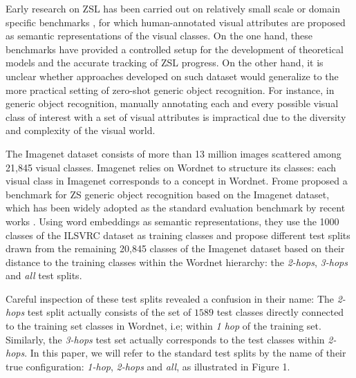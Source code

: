 Early research on ZSL has been carried out on relatively small scale or domain specific benchmarks \cite{lampert2009learning,patterson2012sun,welinder2010caltech}, 
for which human-annotated visual attributes are proposed as semantic representations of the visual classes. 
On the one hand, these benchmarks have provided a controlled setup for the development of theoretical models and the accurate tracking of ZSL progress. 
On the other hand, it is unclear whether approaches developed on such dataset would generalize to the more practical setting of zero-shot generic object recognition.
For instance, in generic object recognition, manually annotating each and every possible visual class of interest with a set of visual attributes is impractical due to the diversity and complexity of the visual world. 

The Imagenet dataset \cite{deng2009imagenet} consists of more than 13 million images scattered among 21,845 visual classes.
Imagenet relies on Wordnet \cite{miller1995wordnet} to structure its classes: each visual class in Imagenet corresponds to a concept in Wordnet.
Frome \etal \cite{frome2013devise} proposed a benchmark for ZS generic object recognition based on the Imagenet dataset,
which has been widely adopted as the standard evaluation benchmark by recent works
\cite{norouzi2013zero,xian2016latent,romera2015embarrassingly,changpinyo2016synthesized,xian2017zero,kampffmeyer2018rethinking,wang2018zero}.
Using word embeddings as semantic representations, 
they use the 1000 classes of the ILSVRC dataset as training classes
and propose different test splits drawn from the remaining 20,845 classes of the Imagenet dataset 
based on their distance to the training classes within the Wordnet hierarchy:
the \textit{2-hops}, \textit{3-hops} and \textit{all} test splits.

Careful inspection of these test splits revealed a confusion in their name: 
The \textit{2-hops} test split actually consists of the set of $1589$ test classes directly connected to the training set classes in Wordnet, i.e; within \textit{1 hop} of the training set.
Similarly, the \textit{3-hops} test set actually corresponds to the test classes within \textit{2-hops}.
In this paper, we will refer to the standard test splits by the name of their true configuration:
\textit{1-hop}, \textit{2-hops} and \textit{all}, as illustrated in Figure 1.

